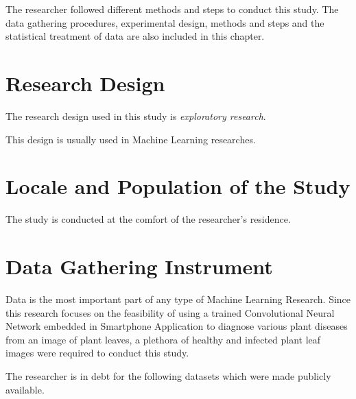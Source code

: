 

The researcher followed different methods and 
steps to conduct this study. The data gathering
procedures, experimental design, methods and steps 
and the statistical treatment of data are also 
included in this chapter.

\section{Research Design}
The research design used in this study is \emph{exploratory research}.


This design is usually used in Machine Learning researches. 

\section{Locale and Population of the Study}
The study is conducted at the comfort of the researcher's residence. 


\section{Data Gathering Instrument}
Data is the most important part of any type of Machine Learning Research. 
Since this research focuses on the feasibility of using a trained 
Convolutional Neural Network embedded in Smartphone Application to diagnose 
various plant diseases from an image of plant leaves, a plethora of 
healthy and infected plant leaf images were required to conduct this study. 

The researcher is in debt for the following datasets which were made publicly 
available. 

